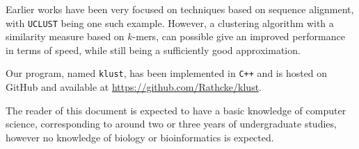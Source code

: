 Earlier works have been very focused on techniques based on sequence alignment,
with \texttt{UCLUST} being one such example. However, a clustering algorithm
with a similarity measure based on $k$-mers, can possible give an improved
performance in terms of speed, while still being a sufficiently good
approximation.

Our program, named \texttt{klust}, has been implemented in \texttt{C++} and is
hosted on GitHub and available at \url{https://github.com/Rathcke/klust}.

The reader of this document is expected to have a basic knowledge of computer
science, corresponding to around two or three years of undergraduate studies,
however no knowledge of biology or bioinformatics is expected.
